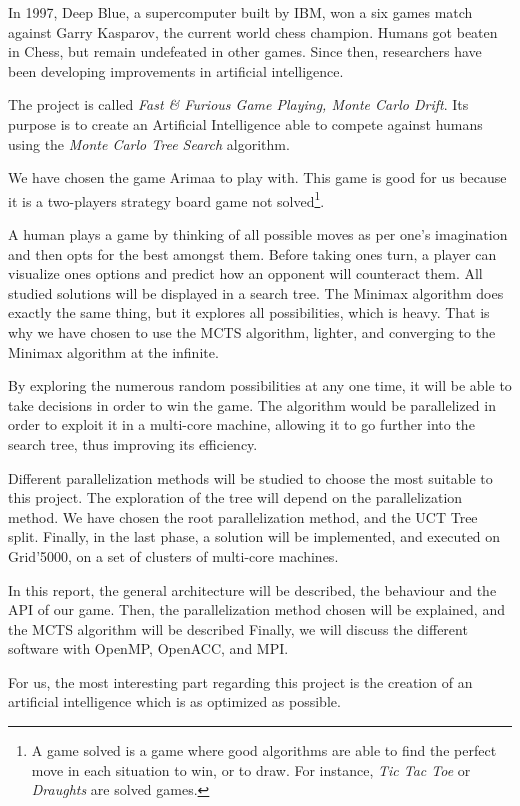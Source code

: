 
In 1997, Deep Blue, a supercomputer built by IBM, won a six games match against Garry Kasparov, the current world chess champion. Humans got beaten in Chess, but remain undefeated in other games. Since then, researchers have been developing improvements in artificial intelligence.

The project is called \emph{Fast \& Furious Game Playing, Monte Carlo Drift}. Its purpose is to create an Artificial Intelligence able to compete against humans using the \emph{Monte Carlo Tree Search} algorithm.

We have chosen the game Arimaa to play with. This game is good for us because it is a two-players strategy board game not solved\footnote{A game solved is a game where good algorithms are able to find the perfect move in each situation to win, or to draw. For instance, \textit{Tic Tac Toe} or \textit{Draughts} are solved games.}.

A human plays a game by thinking of all possible moves as per one's imagination and then opts for the best amongst them. Before taking ones turn, a player can visualize ones options and predict how an opponent will counteract them. All studied solutions will be displayed in a search tree. The Minimax algorithm does exactly the same thing, but it explores all possibilities, which is heavy. That is why we have chosen to use the MCTS algorithm, lighter, and converging to the Minimax algorithm at the infinite.

By exploring the numerous random possibilities at any one time, it will be able to take decisions in order to win the game.
The algorithm would be parallelized in order to exploit it in a multi-core machine, allowing it to go further into the search tree, thus improving its efficiency.

Different parallelization methods will be studied to choose the most suitable to this project.
The exploration of the tree will depend on the parallelization method. We have chosen the root parallelization method, and the UCT Tree split.
Finally, in the last phase, a solution will be implemented, and executed on Grid'5000, on a set of clusters of multi-core machines.


In this report, the general architecture will be described, the behaviour and the API of our game.
Then, the parallelization method chosen will be explained, and the MCTS algorithm will be described
Finally, we will discuss the different software with OpenMP, OpenACC, and MPI.

For us, the most interesting part regarding this project is the creation of an artificial intelligence which is as optimized as possible.